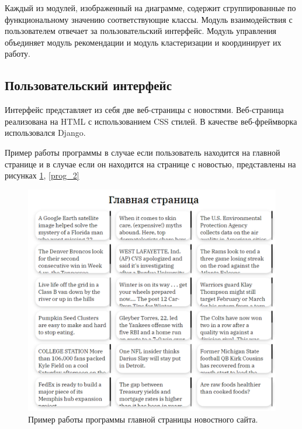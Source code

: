 Каждый из модулей, изображенный на диаграмме, содержит сгруппированные по функциональному значению соответствующие классы. Модуль взаимодействия с пользователем отвечает за пользовательский интерфейс. Модуль управления объединяет модуль рекомендации и модуль кластеризации и координирует их работу.

\subsection{Пользовательский интерфейс}

Интерфейс представляет из себя две веб-страницы с новостями. Веб-страница реализована на HTML с использованием CSS стилей. В качестве веб-фреймворка использовался Django.

Пример работы программы в случае если пользователь находится на главной странице и в случае если он находится на странице с новостью, представлены на рисунках \ref{prog_1}, \ref{prog_2}

\begin{figure}[H]
	\centering
	\includegraphics[width=\textwidth]{img/prog_1.pdf}
	\caption{Пример работы программы главной страницы новостного сайта.}
	\label{prog_1}
\end{figure}  

